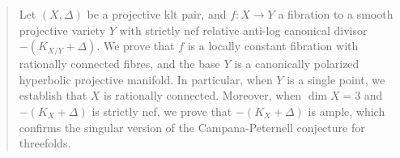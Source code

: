 \begin{abstract}
Let $(X,\Delta)$ be a projective klt pair, and  $f:X\to Y$  a fibration to a smooth projective variety $Y$ with strictly nef relative anti-log canonical divisor $-(K_{X/Y}+\Delta)$.
We prove that $f$ is a locally constant fibration  with rationally connected fibres, and the base  $Y$ is a canonically polarized  hyperbolic projective manifold. In particular,  when  $Y$ is a single point, we establish that  $X$ is rationally connected. 
Moreover, when $\dim X=3$ and $-(K_X+\Delta)$ is strictly nef, we prove that $-(K_X+\Delta)$ is ample, which confirms the singular version of the Campana-Peternell conjecture for threefolds.

\end{abstract}
